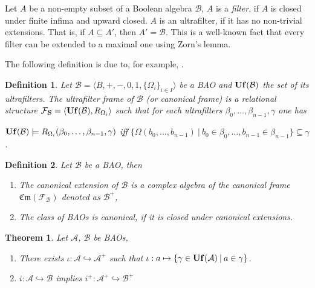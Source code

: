 \documentclass[a4paper]{article}
\theoremstyle{defin}
\newtheorem{defin}{Definition}
\theoremstyle{theorem}
\newtheorem{theorem}{Theorem}
\theoremstyle{prop}
\theoremstyle{lemma}
\theoremstyle{fact}
\theoremstyle{ex}
\theoremstyle{col}
\begin{document}
Let $A$ be a non-empty subset of a Boolean algebra $\mathcal{B}$, $A$ is a \emph{filter}, if $A$ is closed under finite infima and upward closed. $A$ is an ultrafilter, if it has no non-trivial extensions. That is, if $A \subseteq A'$, then $A' = \mathcal{B}$. This is a well-known fact that every filter can be extended to a maximal one using Zorn's lemma.

The following definition is due to, for example, \cite[Definition 5.40]{venema2010}.

\begin{defin}
  Let $\mathcal{B} = \langle B, +, -, 0, 1, \{ \Omega_i \}_{i \in I} \rangle$ be a BAO and ${\bf Uf}(\mathcal{B})$ the set of its ultrafilters. The ultrafilter frame of $\mathcal{B}$ (or canonical frame) is a relational structure $\mathcal{F}_{\mathcal{B}} = \langle {\bf Uf}(\mathcal{B}), R_{\Omega_i} \rangle$ such that for each ultrafilters $\beta_0, \dots, \beta_{n - 1}, \gamma$ one has
  \begin{center}
    ${\bf Uf}(\mathcal{B}) \models R_{\Omega_i}(\beta_0, \dots, \beta_{n - 1}, \gamma)$ iff $\{ \Omega(b_0, \dots, b_{n - 1}) \: | \: b_0 \in \beta_0, \dots, b_{n - 1} \in \beta_{n - 1}\} \subseteq \gamma$.
  \end{center}
\end{defin}

\begin{defin} Let $\mathcal{B}$ be a BAO, then

  \begin{enumerate}
    \item The canonical extension of $\mathcal{B}$ is a complex algebra of the canonical frame $\mathfrak{Cm}(\mathcal{F}_{\mathcal{B}})$ denoted as $\mathcal{B}^{+}$,
    \item The class of BAOs is canonical, if it is closed under canonical extensions.
  \end{enumerate}
\end{defin}

\begin{theorem} Let $\mathcal{A}$, $\mathcal{B}$ be BAOs,

\begin{enumerate}
  \item There exists $\iota : \mathcal{A} \hookrightarrow \mathcal{A}^{+}$ such that
  $\iota : a \mapsto \{ \gamma \in {\bf Uf}(\mathcal{A}) \: | \: a \in \gamma \}$.
  \item $i : \mathcal{A} \hookrightarrow \mathcal{B}$ implies
  $i^{+} : \mathcal{A}^{+} \hookrightarrow \mathcal{B}^{+}$
\end{enumerate}
\end{theorem}
\end{document}
